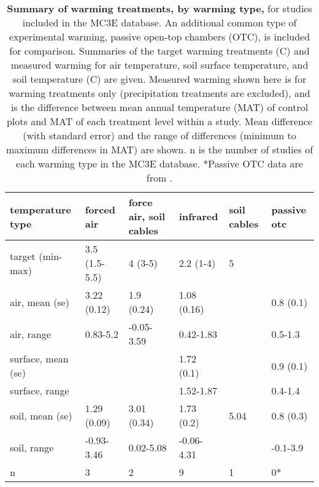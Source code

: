 \documentclass{article}
\begin{document}
\clearpage
\begin{footnotesize} 

\begin{table}[ht]
\centering
\caption{\textbf{Summary of warming treatments, by warming type,} for studies included in the MC3E database. An additional common type of experimental warming, passive open-top chambers (OTC), is included for comparison. Summaries of the target warming treatments (\degree C) and measured warming for air temperature, soil surface temperature, and soil temperature (\degree C) are given. Measured warming shown here is for warming treatments only (precipitation treatments are excluded), and is the difference between mean annual temperature (MAT) of control plots and MAT of each treatment level within a study. Mean difference (with standard error) and the range of differences (minimum to maximum differences in MAT) are shown. n is the number of studies of each warming type in the MC3E database. *Passive OTC data are from \cite{bokhorst2013}.} 
\label{tab:warmtreats}
\begingroup\footnotesize
\begin{tabular}{|p{}p{}p{}p{}p{}p{}|}
  \hline
temperature type & forced air & force air, soil cables & infrared & soil cables & passive otc \\ 
  \hline
target (min-max) & 3.5 (1.5-5.5) & 4 (3-5) & 2.2 (1-4) & 5 &   \\ 
  air, mean (se) & 3.22 (0.12) & 1.9 (0.24) & 1.08 (0.16) &  & 0.8 (0.1) \\ 
  air, range & 0.83-5.2 & -0.05-3.59 & 0.42-1.83 &  & 0.5-1.3 \\ 
  surface, mean (se) &  &  & 1.72 (0.1) &  & 0.9 (0.1) \\ 
  surface, range &  &  & 1.52-1.87 &  & 0.4-1.4 \\ 
  soil, mean (se) & 1.29 (0.09) & 3.01 (0.34) & 1.73 (0.2) & 5.04 & 0.8 (0.3) \\ 
  soil, range & -0.93-3.46 & 0.02-5.08 & -0.06-4.31 &   & -0.1-3.9 \\ 
  n & 3 & 2 & 9 & 1 & 0* \\ 
   \hline
\end{tabular}
\endgroup
\end{table}\end{footnotesize} 
\clearpage
\end{document}
